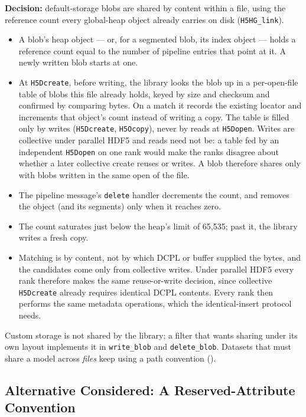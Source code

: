 \documentclass[../RFC-HDFG-2026-003.tex]{subfiles}
\begin{document}
\noindent\textbf{Decision:} default-storage blobs are shared by content
within a file, using the reference count every global-heap object already
carries on disk (\texttt{H5HG\_link}).
\begin{itemize}
\item A blob's heap object --- or, for a segmented blob, its index
  object --- holds a reference count equal to the number of pipeline
  entries that point at it.  A newly written blob starts at one.
\item At \texttt{H5Dcreate}, before writing, the library looks the blob up
  in a per-open-file table of blobs this file already holds, keyed by
  size and checksum and confirmed by comparing bytes.  On a match it
  records the existing locator and increments that object's count instead
  of writing a copy.  The table is filled only by writes
  (\texttt{H5Dcreate}, \texttt{H5Ocopy}), never by reads at
  \texttt{H5Dopen}.  Writes are collective under parallel HDF5 and reads
  need not be: a table fed by an independent \texttt{H5Dopen} on one rank
  would make the ranks disagree about whether a later collective create
  reuses or writes.  A blob therefore shares only with blobs written in
  the same open of the file.
\item The pipeline message's \texttt{delete} handler decrements the
  count, and removes the object (and its segments) only when it reaches
  zero.
\item The count saturates just below the heap's limit of 65{,}535; past
  it, the library writes a fresh copy.
\item Matching is by content, not by which DCPL or buffer supplied the
  bytes, and the candidates come only from collective writes.  Under
  parallel HDF5 every rank therefore makes the same reuse-or-write
  decision, since collective \texttt{H5Dcreate} already requires
  identical DCPL contents.  Every rank then performs the same
  metadata operations, which the identical-insert protocol needs.
\end{itemize}
Custom storage is not shared by the library; a filter that wants sharing
under its own layout implements it in \texttt{write\_blob} and
\texttt{delete\_blob}.  Datasets that must share a model across
\emph{files} keep using a path convention ().

\subsection{Alternative Considered: A Reserved-Attribute Convention}
\label{sec:blob-alt-attribute}
\end{document}
